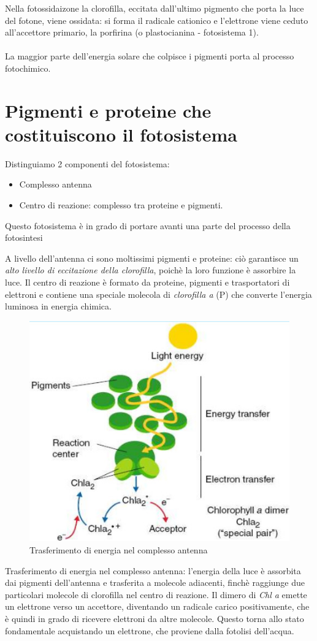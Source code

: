 \documentclass[a4paper,12pt]{book}
\begin{document}
Nella fotossidaizone la clorofilla, eccitata dall'ultimo pigmento che porta la luce del fotone, viene ossidata: si forma il radicale cationico e l'elettrone viene ceduto all'accettore primario, la porfirina (o plastocianina - fotosistema 1).
\paragraph{}
La maggior parte dell'energia solare che colpisce i pigmenti porta al processo fotochimico.

\section{Pigmenti e proteine che costituiscono il fotosistema}
Distinguiamo 2 componenti del fotosistema:
\begin{itemize}
\item{Complesso antenna}
\item{Centro di reazione: complesso tra proteine e pigmenti. }
\end{itemize}
Questo fotosistema è in grado di portare avanti una parte del processo della fotosintesi

A livello dell'antenna ci sono moltissimi pigmenti e proteine: ciò garantisce un \emph{alto livello di eccitazione della clorofilla}, poichè la loro funzione è assorbire la luce. Il centro di reazione è formato da proteine,
pigmenti e trasportatori di elettroni e contiene una speciale molecola di \emph{clorofilla a} (P) che converte
l’energia luminosa in energia chimica. 
\begin{figure}[H]
\centering
\includegraphics[scale=0.35]{immagini/antenna.jpg}
\caption{Trasferimento di energia nel complesso antenna}
\end{figure}
Trasferimento di energia nel complesso antenna: l’energia della luce è
assorbita dai pigmenti dell’antenna e trasferita a molecole adiacenti,
finchè raggiunge due particolari molecole di clorofilla nel centro di
reazione. Il dimero di \emph{Chl a} emette un elettrone verso un accettore,
diventando un radicale carico positivamente, che è quindi in grado di ricevere elettroni da altre molecole. Questo torna allo stato
fondamentale acquistando un elettrone, che proviene dalla fotolisi dell'acqua.
\end{document}
